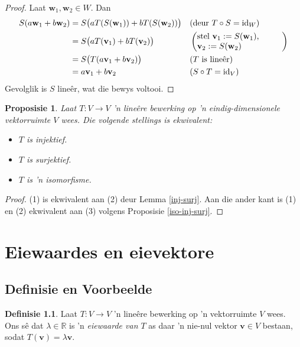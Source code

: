 \documentclass[a4paper,11pt]{book}
\newtheorem{proposition}[theorem]{Proposisie}
\theoremstyle{definition}
\newtheorem{definition}[theorem]{Definisie}
\newcommand{\ve}[1]{\mathbf{#1}}
\DeclareMathOperator{\id}{id}
\begin{document}
\begin{proof}
	Laat $\ve{w}_1, \ve{w}_2 \in W$. Dan
	\begin{align*}
		S( a \ve{w}_1 + b \ve{w}_2) &= S\big(a T(S(\ve{w}_1)) + b
		T(S(\ve{w}_2)) \big) && \mbox{(deur $T \circ S = \id_W$)} \\
		&= S\big( a T(\ve{v}_1) + b T(\ve{v}_2) \big) &&
		\left(\mbox{\begin{minipage}{3.5cm}
			stel $\ve{v}_1 := S(\ve{w}_1)$, \\ 
			$\ve{v}_2 := S(\ve{w}_2)$ 
		\end{minipage} } \right)
		\\
		&= S\big(T(a \ve{v}_1 + b \ve{v}_2)\big) && \mbox{($T$ is
		line{\^e}r)} \\
		&= a \ve{v}_1 + b \ve{v}_2 && \mbox{($S \circ T = \id_V$)}
	\end{align*}
	Gevolglik is $S$ line{\^e}r, wat die bewys voltooi.
\end{proof}

\begin{proposition} \label{equiv-inj-sur-iso} Laat $T : V \rightarrow V$ 'n
	line{\^e}re bewerking op 'n eindig-dimensionele vektorruimte $V$ wees.
	Die volgende stellings is ekwivalent:
	\begin{itemize}
		\item[1.] $T$ is injektief.
		\item[2.] $T$ is surjektief.
		\item[3.] $T$ is 'n isomorfisme.
	\end{itemize}
\end{proposition}
\begin{proof} (1) is ekwivalent aan (2) deur Lemma \ref{inj-surj}. Aan die
	ander kant is (1) en (2) ekwivalent aan (3) volgens Proposisie
	\ref{iso-inj-surj}.
\end{proof}



\chapter{Eiewaardes en eievektore}
\section{Definisie en Voorbeelde}
\begin{definition} Laat $T : V \rightarrow V$ 'n line{\^e}re bewerking op
	'n vektorruimte $V$ wees. Ons s{\^e} dat $\lambda \in \mathbb{R}$ is 'n
	\emph{eiewaarde van $T$} as daar 'n nie-nul vektor $\ve{v} \in V$
	bestaan, sodat $T(\ve{v}) = \lambda \ve{v}$.
\end{definition}
\end{document}
